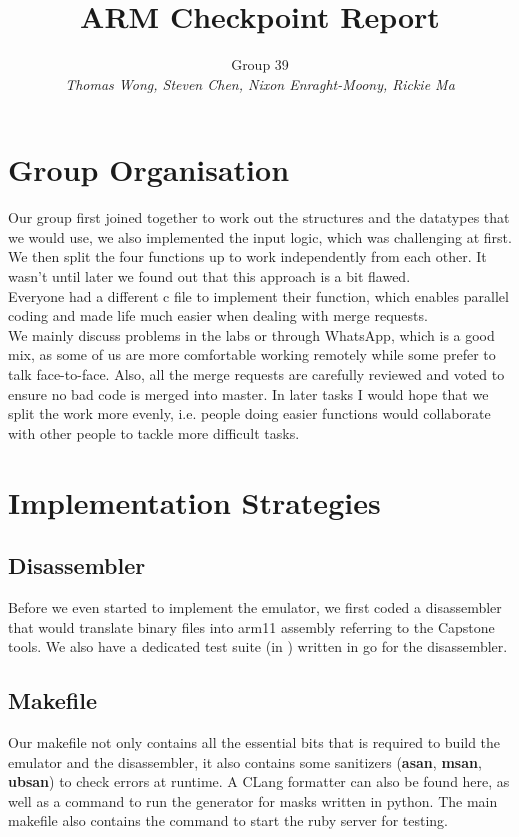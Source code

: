 \documentclass[11pt]{article}
\begin{document}
\title{ARM Checkpoint Report}
\author{Group 39\\ \small \textit{Thomas Wong, Steven Chen, Nixon Enraght-Moony, Rickie Ma}}

\maketitle

\section{Group Organisation}

Our group first joined together to work out the structures and the datatypes that we would use, we also implemented the input logic, which was challenging at first. \\
We then split the four functions up to work independently from each other. It wasn't until later we found out that this approach is a bit flawed.\\
Everyone had a different c file to implement their function, which enables parallel coding and made life much easier when dealing with merge requests.\\
We mainly discuss problems in the labs or through WhatsApp, which is a good mix, as some of us are more comfortable working remotely while some prefer to talk face-to-face. Also, all the merge requests are carefully reviewed and voted to ensure no bad code is merged into master. In later tasks I would hope that we split the work more evenly, i.e. people doing easier functions would collaborate with other people to tackle more difficult tasks.

\section{Implementation Strategies}

\subsection{Disassembler}
Before we even started to implement the emulator, we first coded a disassembler that would translate binary files into arm11 assembly referring to the Capstone tools. We also have a dedicated test suite (in ) written in go for the disassembler.

\subsection{Makefile}
Our makefile  not only contains all the essential bits that is required to build the emulator and the disassembler, it also contains some sanitizers (\textbf{asan}, \textbf{msan}, \textbf{ubsan}) to check errors at runtime. A CLang formatter can also be found here, as well as a command to run the generator for masks written in python. The main makefile  also contains the command to start the ruby server for testing.
\end{document}
